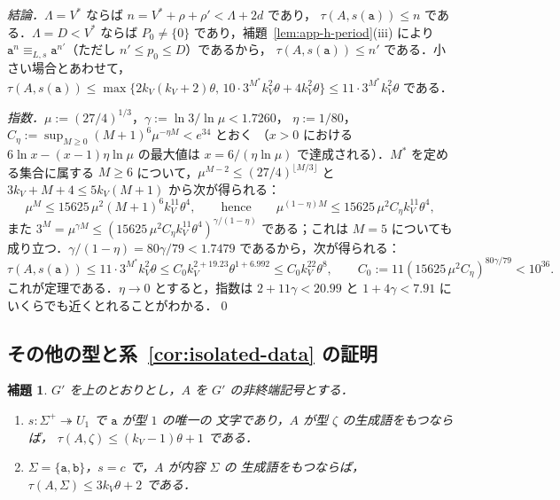 \documentclass[11pt,a4paper]{ltjsarticle}
\numberwithin{equation}{section}
\theoremstyle{plain}
\newtheorem{lemma}[theorem]{補題}
\theoremstyle{definition}
\theoremstyle{remark}
\theoremstyle{plain}
\begin{document}
\emph{結論．}$\Lambda=V^*$ ならば $n=V^*+\rho+\rho'<\Lambda+2d$ であり，
$\tau(A,s(\mathtt a))\le n$ である．$\Lambda=D<V^*$ ならば $P_0\ne\{0\}$
であり，補題~\ref{lem:app-h-period}(iii) により
$\mathtt a^n\equiv_{L,s}\mathtt a^{n'}$（ただし $n'\le p_0\le D$）であるから，
$\tau(A,s(\mathtt a))\le n'$ である．小さい場合とあわせて，
$\tau(A,s(\mathtt a))\le\max\{2k_V(k_V+2)\theta,\,10\cdot3^{M^*}k_V^2\theta+4k_V^2\theta\}
\le11\cdot3^{M^*}k_V^2\theta$ である．

\emph{指数．}$\mu:=(27/4)^{1/3}$，$\gamma:=\ln3/\ln\mu<1.7260$，
$\eta:=1/80$，$C_\eta:=\sup_{M\ge0}(M+1)^6\mu^{-\eta M}<e^{34}$ とおく
（$x>0$ における $6\ln x-(x-1)\eta\ln\mu$ の最大値は
$x=6/(\eta\ln\mu)$ で達成される）．$M^*$ を定める集合に属する $M\ge6$
について，$\mu^{M-2}\le(27/4)^{\lfloor M/3\rfloor}$ と
$3k_V+M+4\le5k_V(M+1)$ から次が得られる：
\[
 \mu^M\le15625\,\mu^2(M+1)^6k_V^{11}\theta^4,\qquad\text{hence}\qquad
 \mu^{(1-\eta)M}\le15625\,\mu^2C_\eta k_V^{11}\theta^4,
\]
また $3^M=\mu^{\gamma M}\le(15625\,\mu^2C_\eta k_V^{11}\theta^4)^{\gamma/(1-\eta)}$
である；これは $M=5$ についても成り立つ．$\gamma/(1-\eta)=80\gamma/79<1.7479$
であるから，次が得られる：
\[
 \tau(A,s(\mathtt a))\le11\cdot3^{M^*}k_V^2\theta\le C_0k_V^{2+19.23}\theta^{1+6.992}
 \le C_0k_V^{22}\theta^8,\qquad C_0:=11(15625\,\mu^2C_\eta)^{80\gamma/79}<10^{36}.
\]
これが定理である．$\eta\to0$ とすると，指数は $2+11\gamma<20.99$ と
$1+4\gamma<7.91$ にいくらでも近くとれることがわかる．\qed

\subsection{その他の型と系~\ref{cor:isolated-data} の証明}

\begin{lemma}
\label{lem:app-h-other}
$G'$ を上のとおりとし，$A$ を $G'$ の非終端記号とする．
\begin{enumerate}[label=\textup{(\roman*)},leftmargin=*]
\item $s:\Sigma^+\twoheadrightarrow U_1$ で $\mathtt a$ が型 $1$ の唯一の
文字であり，$A$ が型 $\zeta$ の生成語をもつならば，
$\tau(A,\zeta)\le(k_V-1)\theta+1$ である．
\item $\Sigma=\{\mathtt a,\mathtt b\}$，$s=c$ で，$A$ が内容 $\Sigma$ の
生成語をもつならば，$\tau(A,\Sigma)\le3k_V\theta+2$ である．
\end{enumerate}
\end{lemma}
\end{document}
